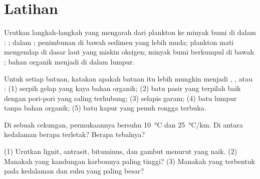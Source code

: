 \section{Latihan}

\begin{exercise}[$\star$]\label{exo:g11:fossil-fuel-geology:1}
Urutkan langkah-langkah yang mengarah dari plankton ke minyak bumi di dalam
: ;  dalam ; penimbunan di bawah sedimen
yang lebih muda; plankton mati mengendap di dasar laut yang miskin oksigen;
minyak bumi berkumpul di bawah ; bahan organik menjadi  di
dalam lumpur.
\end{exercise}

\begin{exercise}[$\star$]\label{exo:g11:fossil-fuel-geology:2}
Untuk setiap batuan, katakan apakah batuan itu lebih mungkin menjadi , , atau : (1) serpih gelap yang kaya bahan
organik; (2) batu pasir yang terpilah baik dengan pori-pori yang saling
terhubung; (3) selapis garam; (4) batu lumpur tanpa bahan organik; (5) batu
kapur yang penuh rongga terbuka.
\end{exercise}

\begin{exercise}[$\star$]\label{exo:g11:fossil-fuel-geology:3}
Di sebuah cekungan, permukaannya bersuhu \qty{10}{\degreeCelsius} dan  \qty{25}{\degreeCelsius/km}. Di antara kedalaman berapa  terletak? Berapa tebalnya?
\end{exercise}

\begin{exercise}[$\star$]\label{exo:g11:fossil-fuel-geology:4}
(1) Urutkan lignit, antrasit,  bituminus, dan gambut menurut 
yang naik. (2) Manakah yang kandungan karbonnya paling tinggi? (3) Manakah yang
terbentuk pada kedalaman dan suhu yang paling besar?
\end{exercise}

